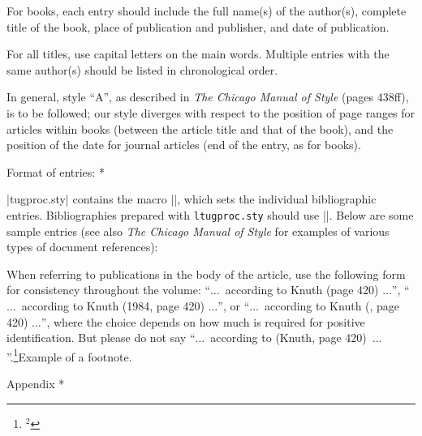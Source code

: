 For books, each entry should include the full name(s) of the author(s),
complete title of the book, place of publication and publisher, and date
of publication.

For all titles, use capital letters on the main words.  Multiple entries
with the same author(s) should be listed in chronological order.

In general, style ``A'', as described in {\sl The Chicago Manual of
Style\/} (pages 438ff), is to be followed; our style diverges with
respect to the position of page ranges for articles within books
(between the article title and that of the book), and the position of
the date for journal articles (end of the entry, as for books).

\subsubhead * Format of entries: *

|tugproc.sty| contains the macro |\entry|, which sets the individual
bibliographic entries.  Bibliographies prepared with {\tt ltugproc.sty}
should use |\bibentry|.
Below are some sample entries (see also {\sl The Chicago Manual of
Style\/} for examples of various types of document references):

\medskip





\medskip

When referring to publications in the body of the article, use the
following form for consistency throughout the volume: ``$\ldots$\
according to Knuth (page 420) $\ldots$'', ``$\ldots$\ according to
Knuth (1984, page 420) $\ldots$'', or ``$\ldots$\ according to Knuth
(\TB, page 420) $\ldots$'', where the choice depends on how much is
required for positive identification.  But please do not say ``$\ldots$\
according to (Knuth, page 420)\ $\ldots$''.\footnote{$^2$}{Example of a
footnote.}

\subhead * Appendix *

